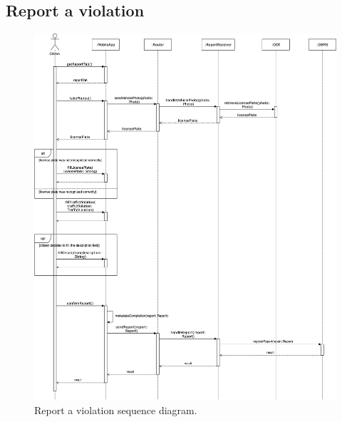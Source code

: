 \subsection{Report a violation}
\begin{figure}[H]
	\centering
	\includegraphics[width=\linewidth]{Images/SequenceDiagramReportViolation}
	\caption{Report a violation sequence diagram.}
\end{figure}
